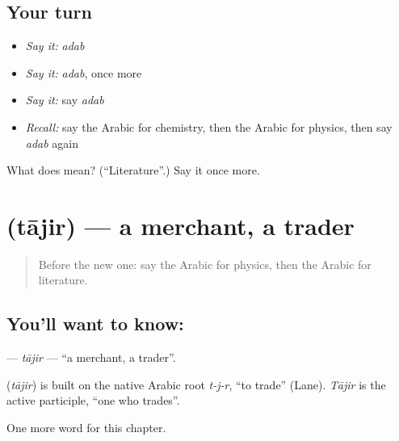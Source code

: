 \subsection*{Your turn}
\begin{itemize}
\raggedright
  \item \emph{Say it:} \emph{adab}
  \item \emph{Say it:} \emph{adab}, once more
  \item \emph{Say it:} say \emph{adab}
  \item \emph{Recall:} say the Arabic for chemistry, then the Arabic for physics, then say \emph{adab} again
\end{itemize}

\begin{tcolorbox}[breakable,colback=teal!4,colframe=teal!35!black,title={Before you move on}]
What does  mean? (\textquotedblleft{}Literature\textquotedblright{}.) Say it once more.
\end{tcolorbox}
\section[\texorpdfstring{\ar{تاجر} (tājir)}{تاجر (tājir)}]{ (tājir) — a merchant, a trader}

\label{lesson:AR-C222-tajir}



\begin{quote}
Before the new one: say the Arabic for physics, then the Arabic for literature.
\end{quote}

\subsection*{You'll want to know: }
\textbf{} — \emph{tājir} — \textquotedblleft{}a merchant, a trader\textquotedblright{}.

\begin{cousinweb}
\textbf{} (\emph{tājir}) is built on the native Arabic root \emph{t-j-r}, \textquotedblleft{}to trade\textquotedblright{} (Lane). \emph{Tājir} is the active participle, \textquotedblleft{}one who trades\textquotedblright{}.
\end{cousinweb}

\begin{grammarlens}[title={What you've built}]
One more word for this chapter.
\end{grammarlens}

